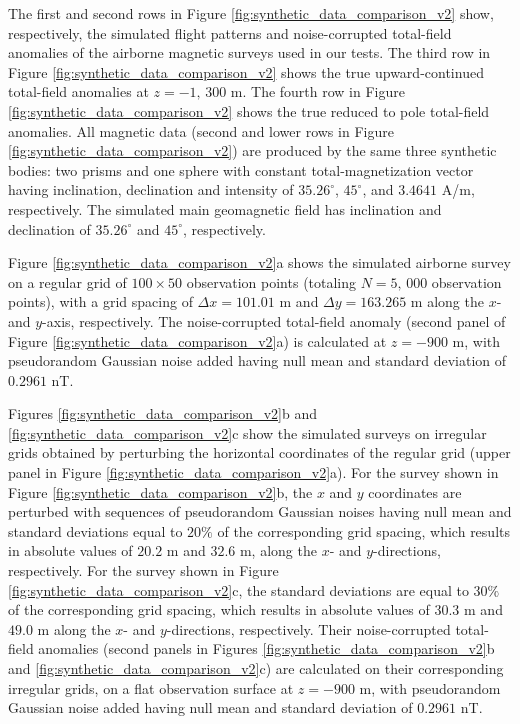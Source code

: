 \documentclass[manuscript,noblind]{geophysics}
\begin{document}
The first and second rows in Figure \ref{fig:synthetic_data_comparison_v2} show, respectively, 
the simulated flight patterns and noise-corrupted total-field anomalies of the airborne magnetic 
surveys used in our tests. The third row in Figure \ref{fig:synthetic_data_comparison_v2} shows 
the true upward-continued total-field anomalies at $z = -1, \, 300$ m. The fourth row in Figure \ref{fig:synthetic_data_comparison_v2} shows the true reduced to pole total-field anomalies.
All magnetic data (second and lower rows in Figure \ref{fig:synthetic_data_comparison_v2}) 
are produced by the same three synthetic bodies: two prisms and one sphere with 
constant total-magnetization vector having inclination, declination and intensity of 
$35.26^{\circ}$, $45^{\circ}$, and $3.4641$ A/m, respectively. 
The simulated main geomagnetic field has inclination and declination of $35.26^{\circ}$ and $45^{\circ}$,
respectively. 


Figure \ref{fig:synthetic_data_comparison_v2}a shows the simulated airborne survey on
a regular grid of $100 \times 50$ observation points (totaling  $N = 5,\, 000$ observation points),
with a grid spacing of $\Delta x = 101.01$ m and $\Delta y = 163.265$ m along the
$x$- and $y$-axis, respectively.
The noise-corrupted total-field anomaly (second panel of Figure \ref{fig:synthetic_data_comparison_v2}a) 
is calculated at $z = -900$ m, with pseudorandom Gaussian noise added having null mean and standard deviation of $0.2961$ nT.


Figures \ref{fig:synthetic_data_comparison_v2}b and \ref{fig:synthetic_data_comparison_v2}c 
show the simulated surveys on irregular grids obtained by perturbing the horizontal coordinates
of the regular grid (upper panel in Figure \ref{fig:synthetic_data_comparison_v2}a).
For the survey shown in Figure \ref{fig:synthetic_data_comparison_v2}b, the $x$ and $y$ coordinates 
are perturbed with sequences of pseudorandom Gaussian noises having null mean and standard deviations
equal to $20\%$ of the corresponding grid spacing, which results in
absolute values of $20.2$ m and $32.6$ m, along the $x$- and $y$-directions, respectively.
For the survey shown in Figure \ref{fig:synthetic_data_comparison_v2}c, the standard deviations
are equal to $30\%$ of the corresponding grid spacing, which results in absolute values of 
$30.3$ m and $49.0$ m along the $x$- and $y$-directions, respectively.
Their noise-corrupted total-field anomalies (second panels in Figures 
\ref{fig:synthetic_data_comparison_v2}b and \ref{fig:synthetic_data_comparison_v2}c) are calculated 
on their corresponding irregular grids, on a flat observation surface at $z = -900$ m, 
with pseudorandom Gaussian noise added having null mean and standard deviation of $0.2961$ nT.
\end{document}
